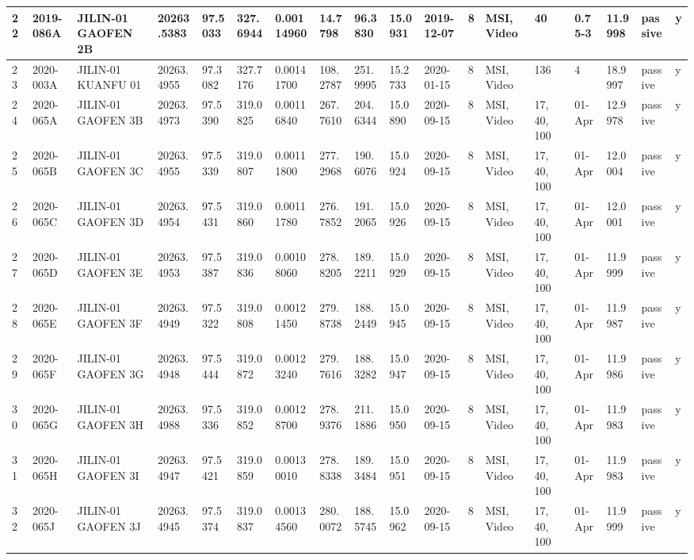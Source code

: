 \documentclass[12pt,a4paper,notitlepage,twoside,openright]{report}
\begin{document}
\begin{longtable}{|l|l|l|l|l|l|l|l|l|l|l|l|l|l|l|l|l|l|}
        22 & 2019-086A & JILIN-01 GAOFEN 2B & 20263.5383 & 97.5033 & 327.6944 & 0.00114960 & 14.7798 & 96.3830 & 15.0931 & 2019-12-07 & 8 & MSI, Video & 40 & 0.75-3 & 11.9998 & passive & y \\ \hline
        23 & 2020-003A & JILIN-01 KUANFU 01 & 20263.4955 & 97.3082 & 327.7176 & 0.00141700 & 108.2787 & 251.9995 & 15.2733 & 2020-01-15 & 8 & MSI, Video & 136 & 4 & 18.9997 & passive & y \\ \hline
        24 & 2020-065A & JILIN-01 GAOFEN 3B & 20263.4973 & 97.5390 & 319.0825 & 0.00116840 & 267.7610 & 204.6344 & 15.0890 & 2020-09-15 & 8 & MSI, Video & 17, 40, 100 & 01-Apr & 12.9978 & passive & y \\ \hline
        25 & 2020-065B & JILIN-01 GAOFEN 3C & 20263.4955 & 97.5339 & 319.0807 & 0.00111800 & 277.2968 & 190.6076 & 15.0924 & 2020-09-15 & 8 & MSI, Video & 17, 40, 100 & 01-Apr & 12.0004 & passive & y \\ \hline
        26 & 2020-065C & JILIN-01 GAOFEN 3D & 20263.4954 & 97.5431 & 319.0860 & 0.00111780 & 276.7852 & 191.2065 & 15.0926 & 2020-09-15 & 8 & MSI, Video & 17, 40, 100 & 01-Apr & 12.0001 & passive & y \\ \hline
        27 & 2020-065D & JILIN-01 GAOFEN 3E & 20263.4953 & 97.5387 & 319.0836 & 0.00108060 & 278.8205 & 189.2211 & 15.0929 & 2020-09-15 & 8 & MSI, Video & 17, 40, 100 & 01-Apr & 11.9999 & passive & y \\ \hline
        28 & 2020-065E & JILIN-01 GAOFEN 3F & 20263.4949 & 97.5322 & 319.0808 & 0.00121450 & 279.8738 & 188.2449 & 15.0945 & 2020-09-15 & 8 & MSI, Video & 17, 40, 100 & 01-Apr & 11.9987 & passive & y \\ \hline
        29 & 2020-065F & JILIN-01 GAOFEN 3G & 20263.4948 & 97.5444 & 319.0872 & 0.00123240 & 279.7616 & 188.3282 & 15.0947 & 2020-09-15 & 8 & MSI, Video & 17, 40, 100 & 01-Apr & 11.9986 & passive & y \\ \hline
        30 & 2020-065G & JILIN-01 GAOFEN 3H & 20263.4988 & 97.5336 & 319.0852 & 0.00128700 & 278.9376 & 211.1886 & 15.0950 & 2020-09-15 & 8 & MSI, Video & 17, 40, 100 & 01-Apr & 11.9983 & passive & y \\ \hline
        31 & 2020-065H & JILIN-01 GAOFEN 3I & 20263.4947 & 97.5421 & 319.0859 & 0.00130010 & 278.8338 & 189.3484 & 15.0951 & 2020-09-15 & 8 & MSI, Video & 17, 40, 100 & 01-Apr & 11.9983 & passive & y \\ \hline
        32 & 2020-065J & JILIN-01 GAOFEN 3J & 20263.4945 & 97.5374 & 319.0837 & 0.00134560 & 280.0072 & 188.5745 & 15.0962 & 2020-09-15 & 8 & MSI, Video & 17, 40, 100 & 01-Apr & 11.9999 & passive & y \\ \hline

\end{longtable}
\end{document}
